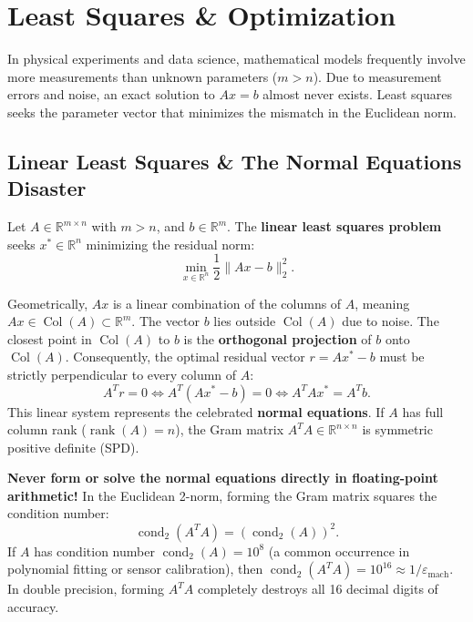 \section{Least Squares \& Optimization}

In physical experiments and data science, mathematical models frequently involve more measurements than unknown parameters ($m > n$). Due to measurement errors and noise, an exact solution to $A x = b$ almost never exists. Least squares seeks the parameter vector that minimizes the mismatch in the Euclidean norm.

\subsection{Linear Least Squares \& The Normal Equations Disaster}

\begin{definition}
    Let $A \in \mathbb{R}^{m \times n}$ with $m > n$, and $b \in \mathbb{R}^m$. The \textbf{linear least squares problem} seeks $x^* \in \mathbb{R}^n$ minimizing the residual norm:
    \begin{equation}
        \min_{x \in \mathbb{R}^n} \frac{1}{2} \|A x - b\|_2^2.
    \end{equation}
\end{definition}

Geometrically, $A x$ is a linear combination of the columns of $A$, meaning $A x \in \operatorname{Col}(A) \subset \mathbb{R}^m$. The vector $b$ lies outside $\operatorname{Col}(A)$ due to noise. The closest point in $\operatorname{Col}(A)$ to $b$ is the \textbf{orthogonal projection} of $b$ onto $\operatorname{Col}(A)$. Consequently, the optimal residual vector $r = A x^* - b$ must be strictly perpendicular to every column of $A$:
\begin{equation}
    A^T r = 0 \iff A^T (A x^* - b) = 0 \iff A^T A x^* = A^T b.
\end{equation}
This linear system represents the celebrated \textbf{normal equations}. If $A$ has full column rank ($\operatorname{rank}(A) = n$), the Gram matrix $A^T A \in \mathbb{R}^{n \times n}$ is symmetric positive definite (SPD).

\begin{important}
    \textbf{Never form or solve the normal equations directly in floating-point arithmetic!} In the Euclidean 2-norm, forming the Gram matrix squares the condition number:
    \begin{equation}
        \operatorname{cond}_2(A^T A) = (\operatorname{cond}_2(A))^2.
    \end{equation}
    If $A$ has condition number $\operatorname{cond}_2(A) = 10^8$ (a common occurrence in polynomial fitting or sensor calibration), then $\operatorname{cond}_2(A^T A) = 10^{16} \approx 1/\varepsilon_{\text{mach}}$. In double precision, forming $A^T A$ completely destroys all 16 decimal digits of accuracy.
\end{important}

